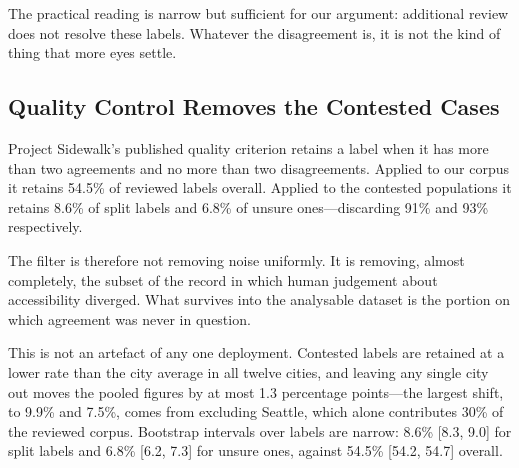 The practical reading is narrow but sufficient for our argument: additional
review does not resolve these labels. Whatever the disagreement is, it is not
the kind of thing that more eyes settle.

\subsection{Quality Control Removes the Contested Cases}

Project Sidewalk's published quality criterion retains a label when it has more
than two agreements and no more than two disagreements. Applied to our corpus it
retains 54.5\% of reviewed labels overall. Applied to the contested populations
it retains 8.6\% of split labels and 6.8\% of unsure ones---discarding 91\% and
93\% respectively.

The filter is therefore not removing noise uniformly. It is removing, almost
completely, the subset of the record in which human judgement about
accessibility diverged. What survives into the analysable dataset is the portion
on which agreement was never in question.

This is not an artefact of any one deployment. Contested labels are retained at
a lower rate than the city average in all twelve cities, and leaving any single
city out moves the pooled figures by at most 1.3 percentage points---the largest
shift, to 9.9\% and 7.5\%, comes from excluding Seattle, which alone
contributes 30\% of the reviewed corpus. Bootstrap intervals over labels are
narrow: 8.6\% [8.3, 9.0] for split labels and 6.8\% [6.2, 7.3] for unsure ones,
against 54.5\% [54.2, 54.7] overall.

